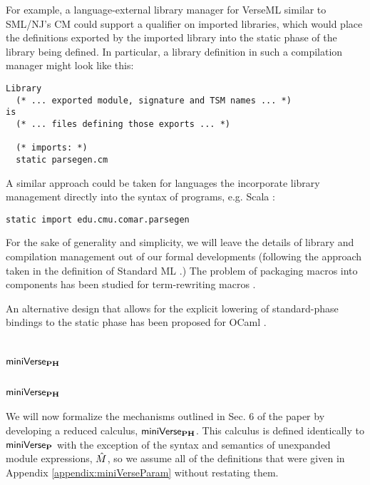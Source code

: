 {For example, a language-external library manager for VerseML similar to SML/NJ's CM \cite{blume:smlnj-cm} could support a  qualifier on imported libraries, which would place the definitions exported by the imported library into the static phase of the library being defined. In particular, a library definition in such a compilation manager might look like this:
\begin{lstlisting}[numbers=none,morekeywords={Library,is}]
Library 
  (* ... exported module, signature and TSM names ... *)
is 
  (* ... files defining those exports ... *)

  (* imports: *)
  static parsegen.cm 
\end{lstlisting}

A similar approach could be taken for languages the incorporate library management directly into the syntax of programs, e.g. Scala \cite{odersky2008programming}:
\begin{lstlisting}[numbers=none]
static import edu.cmu.comar.parsegen
\end{lstlisting}

For the sake of generality and simplicity, we will leave the details of library and compilation management out of our formal developments (following the approach taken in the definition of Standard ML \cite{mthm97-for-dart}.) The problem of packaging macros into components has been studied for term-rewriting macros \cite{culpepper2005syntactic}.

An alternative design that allows for the explicit lowering of standard-phase bindings to the static phase has been proposed for OCaml \cite{Ocaml/macros}. 


\fi

\ificfp
\chapter{\texorpdfstring{$\mathsf{miniVerse}_\textbf{PH}$}{miniVersePH}}
\else
\section{\texorpdfstring{$\mathsf{miniVerse}_\textbf{PH}$}{miniVersePH}}
\fi
\ificfp

We will now formalize the mechanisms outlined in Sec. 6 of the paper by developing a reduced calculus, $\mathsf{miniVerse}_\textbf{PH}$. This calculus is defined identically to $\mathsf{miniVerse}_\textbf{P}$ with the exception of the syntax and semantics of unexpanded module expressions, ${\hat M}$, so we assume all of the definitions that were given in Appendix \ref{appendix:miniVerseParam} without restating them. 

}
